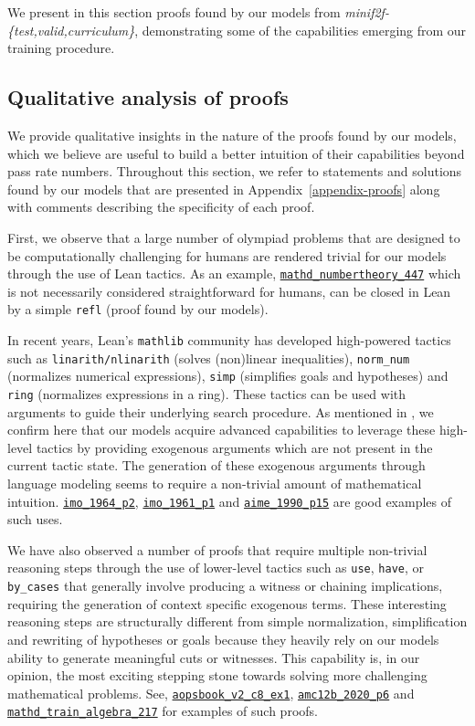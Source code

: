 \documentclass[nohyperref]{article}
\theoremstyle{plain}
\theoremstyle{definition}
\theoremstyle{remark}
\begin{document}
We present in this section proofs found by our models from \textit{minif2f-\{test,valid,curriculum\}}, demonstrating some of the capabilities emerging from our training procedure.

\subsection{Qualitative analysis of proofs}
\label{appendix-qualitative}

We provide qualitative insights in the nature of the proofs found by our models, which we believe are useful to build a better intuition of their capabilities beyond pass rate numbers. Throughout this section, we refer to statements and solutions found by our models that are presented in Appendix~\ref{appendix-proofs} along with comments describing the specificity of each proof.

First, we observe that a large number of olympiad problems that are designed to be computationally challenging for humans are rendered trivial for our models through the use of Lean tactics. As an example, \hyperref[exprob1]{\texttt{mathd\_numbertheory\_447}} which is not necessarily considered straightforward for humans, can be closed in Lean by a simple \texttt{refl} (proof found by our models).

In recent years, Lean's \texttt{mathlib} community has developed high-powered tactics such as \texttt{linarith/nlinarith} (solves (non)linear inequalities), \texttt{norm\_num} (normalizes numerical expressions), \texttt{simp} (simplifies goals and hypotheses) and \texttt{ring} (normalizes expressions in a ring). These tactics can be used with arguments to guide their underlying search procedure. As mentioned in \citet{zheng2021minif2f}, we confirm here that our models acquire advanced capabilities to leverage these high-level tactics by providing exogenous arguments which are not present in the current tactic state. The generation of these exogenous arguments through language modeling seems to require a non-trivial amount of mathematical intuition. \hyperref[exprob3]{\texttt{imo\_1964\_p2}}, \hyperref[exprob2]{\texttt{imo\_1961\_p1}} and \hyperref[exprob4]{\texttt {aime\_1990\_p15}} are good examples of such uses.

We have also observed a number of proofs that require multiple non-trivial reasoning steps through the use of lower-level tactics such as \texttt {use}, \texttt{have}, or \texttt{by\_cases} that generally involve producing a witness or chaining implications, requiring the generation of context specific exogenous terms. These interesting reasoning steps are structurally different from simple normalization, simplification and rewriting of hypotheses or goals because they heavily rely on our models ability to generate meaningful cuts or witnesses. This capability is, in our opinion, the most exciting stepping stone towards solving more challenging mathematical problems. See, \hyperref[exprob10]{\texttt{aopsbook\_v2\_c8\_ex1}}, \hyperref[exprob9]{\texttt{amc12b\_2020\_p6}} and \hyperref[exprob6]{\texttt{mathd\_train\_algebra\_217}} for examples of such proofs.
\end{document}
